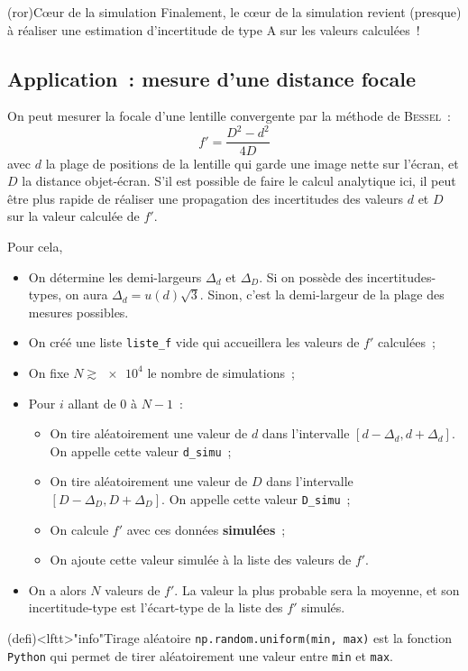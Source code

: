 \documentclass[a4paper, 12pt, garamond]{book}
\begin{document}
\begin{tcn}(ror){Cœur de la simulation}
	Finalement, le cœur de la simulation revient (presque) à réaliser une estimation
	d'incertitude de type A sur les valeurs calculées~!
\end{tcn}

\subsection{Application~: mesure d'une distance focale}
On peut mesurer la focale d'une lentille convergente par la méthode de
\textsc{Bessel}~:
\[
	\boxed{f' = \frac{D^{2}-d^{2}}{4D}}
\]
avec $d$ la plage de positions de la lentille qui garde une image nette sur
l'écran, et $D$ la distance objet-écran. S'il est possible de faire le calcul
analytique ici, il peut être plus rapide de réaliser une propagation des
incertitudes des valeurs $d$ et $D$ sur la valeur calculée de $f'$.

Pour cela,
\begin{itemize}
	\item On détermine les demi-largeurs $\Delta_d$ et $\Delta_D$. Si on possède
	      des incertitudes-types, on aura $\Delta_d = u(d)\sqrt{3}$. Sinon, c'est
	      la demi-largeur de la plage des mesures possibles.
	\item On créé une liste \texttt{liste\_f} vide qui accueillera les valeurs de
	      $f'$ calculées~;
	\item On fixe $N \gtrsim \num{e4}$ le nombre de simulations~;
	\item Pour $i$ allant de 0 à $N-1$~:
	      \begin{itemize}
		      \item On tire aléatoirement une valeur de $d$ dans l'intervalle
		            $[d-\Delta_d, d+\Delta_d]$. On appelle cette valeur
		            \texttt{d\_simu}~;
		      \item On tire aléatoirement une valeur de $D$ dans l'intervalle
		            $[D-\Delta_D, D+\Delta_D]$. On appelle cette valeur
		            \texttt{D\_simu}~;
		      \item On calcule $f'$ avec ces données \textbf{simulées}~;
		      \item On ajoute cette valeur simulée à la liste des valeurs de $f'$.
	      \end{itemize}
	\item On a alors $N$ valeurs de $f'$. La valeur la plus probable
	      sera la moyenne, et son incertitude-type est l'écart-type de
	      la liste des $f'$ simulés.
\end{itemize}
\begin{tcn}(defi)<lftt>"info"{Tirage aléatoire}
	\texttt{np.random.uniform(min, max)} est la fonction \texttt{Python} qui permet
	de tirer aléatoirement une valeur entre \texttt{min} et \texttt{max}.
\end{tcn}
\end{document}
